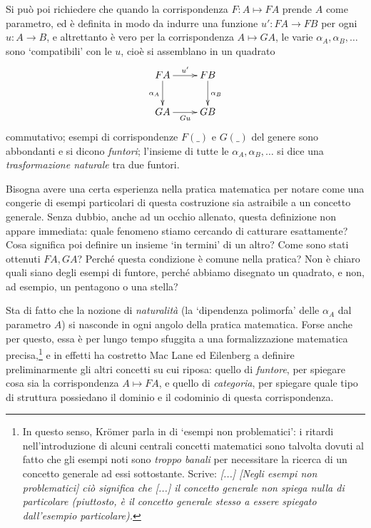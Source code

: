 Si può poi richiedere che quando la corrispondenza \(F : A\mapsto FA\) prende \(A\) come parametro, ed è definita in modo da indurre una funzione \(u' : FA \to FB\) per ogni \(u : A \to B\), e altrettanto è vero per la corrispondenza \(A\mapsto GA\), le varie \(\alpha_A, \alpha_B,\dots\) sono `compatibili' con le \(u\), cioè si assemblano in un quadrato%
\[
	\vcenter{\xymatrix{
			FA\ar[r]^{u'}\ar[d]_{\alpha_A} & FB\ar[d]^{\alpha_B} \\
			GA \ar[r]_{Gu} & GB
		}}
\]
commutativo; esempi di corrispondenze \(F(\_)\) e \(G(\_)\) del genere sono abbondanti e si dicono \emph{funtori}; l'insieme di tutte le \(\alpha_A,\alpha_B,\dots\) si dice una \emph{trasformazione naturale} tra due funtori.

Bisogna avere una certa esperienza nella pratica matematica per notare come una congerie di esempi particolari di questa costruzione sia astraibile a un concetto generale. Senza dubbio, anche ad un occhio allenato, questa definizione non appare immediata: quale fenomeno stiamo cercando di catturare esattamente? Cosa significa poi definire un insieme `in termini' di un altro? Come sono stati ottenuti \(FA,GA\)? Perché questa condizione è comune nella pratica? Non è chiaro quali siano degli esempi di funtore, perché abbiamo disegnato un quadrato, e non, ad esempio, un pentagono o una stella?

Sta di fatto che la nozione di \emph{naturalità} (la `dipendenza polimorfa' delle \(\alpha_A\) dal parametro \(A\)) si nasconde in ogni angolo della pratica matematica. Forse anche per questo, essa è per lungo tempo sfuggita a una formalizzazione matematica precisa,\footnote{In questo senso, Kr\"omer parla in \cite{kromer} di `esempi non problematici': i ritardi nell'introduzione di alcuni centrali concetti matematici sono talvolta dovuti al fatto che gli esempi noti sono \emph{troppo banali} per necessitare la ricerca di un concetto generale ad essi sottostante. Scrive: \emph{[...] [Negli esempi non problematici] ciò significa che [...] il concetto generale non spiega nulla di particolare (piuttosto, è il concetto generale stesso a essere spiegato dall'esempio particolare).}} e in effetti ha costretto Mac Lane ed Eilenberg a definire preliminarmente gli altri concetti su cui riposa: quello di \emph{funtore}, per spiegare cosa sia la corrispondenza \(A\mapsto FA\), e quello di \emph{categoria}, per spiegare quale tipo di struttura possiedano il dominio e il codominio di questa corrispondenza.

